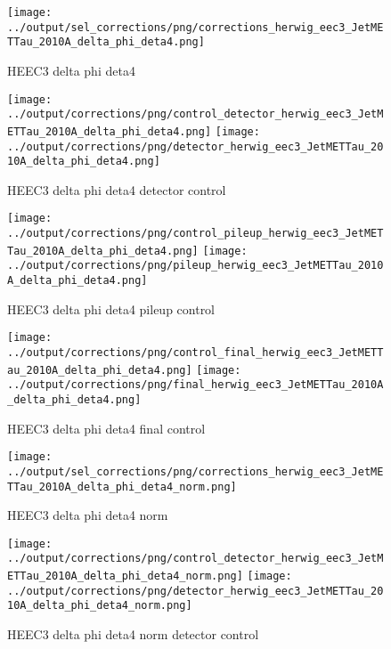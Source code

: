 \documentclass[11pt]{book}
\begin{document}
\begin{figure}[ht]
\centering
\texttt{[image: ../output/sel\_corrections/png/corrections\_herwig\_eec3\_JetMETTau\_2010A\_delta\_phi\_deta4.png]}
\caption{HEEC3 delta phi deta4}
\label{fig:HEEC3_JetMETTau_2010A_delta_phi_deta4}
\end{figure}


\begin{figure}[ht]
\centering
\texttt{[image: ../output/corrections/png/control\_detector\_herwig\_eec3\_JetMETTau\_2010A\_delta\_phi\_deta4.png]}
\texttt{[image: ../output/corrections/png/detector\_herwig\_eec3\_JetMETTau\_2010A\_delta\_phi\_deta4.png]}
\caption{HEEC3 delta phi deta4 detector control}
\label{fig:HEEC3_JetMETTau_2010A_delta_phi_deta4_detector_control}
\end{figure}

\begin{figure}[ht]
\centering
\texttt{[image: ../output/corrections/png/control\_pileup\_herwig\_eec3\_JetMETTau\_2010A\_delta\_phi\_deta4.png]}
\texttt{[image: ../output/corrections/png/pileup\_herwig\_eec3\_JetMETTau\_2010A\_delta\_phi\_deta4.png]}
\caption{HEEC3 delta phi deta4 pileup control}
\label{fig:HEEC3_JetMETTau_2010A_delta_phi_deta4_pileup_control}
\end{figure}


\begin{figure}[ht]
\centering
\texttt{[image: ../output/corrections/png/control\_final\_herwig\_eec3\_JetMETTau\_2010A\_delta\_phi\_deta4.png]}
\texttt{[image: ../output/corrections/png/final\_herwig\_eec3\_JetMETTau\_2010A\_delta\_phi\_deta4.png]}
\caption{HEEC3 delta phi deta4 final control}
\label{fig:HEEC3_JetMETTau_2010A_delta_phi_deta4_final_control}
\end{figure}


\begin{figure}[ht]
\centering
\texttt{[image: ../output/sel\_corrections/png/corrections\_herwig\_eec3\_JetMETTau\_2010A\_delta\_phi\_deta4\_norm.png]}
\caption{HEEC3 delta phi deta4 norm}
\label{fig:HEEC3_JetMETTau_2010A_delta_phi_deta4_norm}
\end{figure}

\begin{figure}[ht]
\centering
\texttt{[image: ../output/corrections/png/control\_detector\_herwig\_eec3\_JetMETTau\_2010A\_delta\_phi\_deta4\_norm.png]}
\texttt{[image: ../output/corrections/png/detector\_herwig\_eec3\_JetMETTau\_2010A\_delta\_phi\_deta4\_norm.png]}
\caption{HEEC3 delta phi deta4 norm detector control}
\label{fig:HEEC3_JetMETTau_2010A_delta_phi_deta4_norm_detector_control}
\end{figure}
\end{document}
